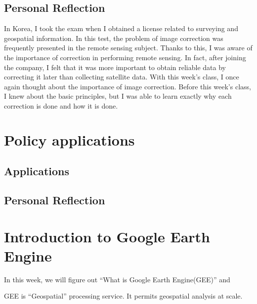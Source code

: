 \documentclass[
  letterpaper,
  DIV=11,
  numbers=noendperiod]{scrreprt}
\begin{document}
\hypertarget{personal-reflection-1}{%
\section{Personal Reflection}\label{personal-reflection-1}}

In Korea, I took the exam when I obtained a license related to surveying
and geospatial information. In this test, the problem of image
correction was frequently presented in the remote sensing subject.
Thanks to this, I was aware of the importance of correction in
performing remote sensing. In fact, after joining the company, I felt
that it was more important to obtain reliable data by correcting it
later than collecting satellite data. With this week's class, I once
again thought about the importance of image correction. Before this
week's class, I knew about the basic principles, but I was able to learn
exactly why each correction is done and how it is done.


\hypertarget{policy-applications}{%
\chapter{Policy applications}\label{policy-applications}}

\hypertarget{applications-2}{%
\section{Applications}\label{applications-2}}

\hypertarget{personal-reflection-2}{%
\section{Personal Reflection}\label{personal-reflection-2}}


\hypertarget{introduction-to-google-earth-engine}{%
\chapter{Introduction to Google Earth
Engine}\label{introduction-to-google-earth-engine}}

In this week, we will figure out ``What is Google Earth Engine(GEE)''
and

GEE is ``Geospatial'' processing service. It permits geospatial analysis
at scale.
\end{document}
